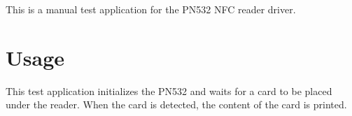 This is a manual test application for the P\+N532 N\+FC reader driver.

\section*{Usage}

This test application initializes the P\+N532 and waits for a card to be placed under the reader. When the card is detected, the content of the card is printed. 